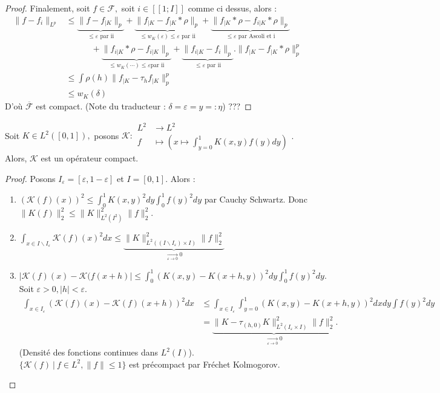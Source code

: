 \begin{proof}
    Finalement, soit $f\in \mathcal{F},$ soit $i\in [\![1;I]\!]$ comme ci dessus, alors :
    \begin{align*}
        \|f-f_i\|_{L^p}&\le \underbrace{\|f-f_{|K}\|_p}_{\le \varepsilon \text{ par ii}} + \underbrace{\|f_{|K}-f_{|K}*\rho\|_{p}}_{\le w_K(\varepsilon )\le \varepsilon \text{ par ii}} + \underbrace{\|f_{|K}*\rho-f_{i|K}*\rho\|_p}_{\le \varepsilon \text{ par Ascoli et i}}\\
        &\hspace{3em}+\underbrace{\|f_{i|K}*\rho-f_{i|K}\|_p}_{\le w_K(\cdots)\le \varepsilon \text{par ii}}+\underbrace{\|f_{i|K}-f_i\|_p}_{\le \varepsilon \text{ par ii}}.
        \|f_{|K}-f_{|K}*\rho\|^p_p \\
        &\le \int \rho(h)\|f_{|K}-\tau_hf_{|K}\|^p_p\\
        &\le w_K(\delta)
    \end{align*}
    D'où $\overline{\mathcal{F}}$ est compact. (Note du traducteur : $\delta=\varepsilon =y=:\eta$) ???
\end{proof}

\begin{ex}
    Soit $K\in L^2([0,1]),$ posons $\mathcal{K} :\begin{aligned}
        L^2 &\longrightarrow L^2 \\
        f &\longmapsto \left(x\mapsto \int_{y=0}^{1} K(x,y)f(y)dy\right)
    \end{aligned}$. Alors, $\mathcal{K}$ est un opérateur compact.
\end{ex}
\begin{proof}
    Posons $I_\varepsilon =[\varepsilon ,1-\varepsilon ]$ et $I=[0,1].$ Alors :
    \begin{enumerate}[label=\roman*]
        \item $\left( \mathcal{K}(f)(x) \right) ^2\le \int_{0}^{1} K(x,y)^2dy \int_{0}^{1} f(y)^2dy  $ par Cauchy Schwartz. Donc $\|K(f)\|^2_2\le \|K\|^2_{L^2(I^2)}\|f\|_2^2.$
        \item $\int_{x\in I \backslash I_\varepsilon }\mathcal{K}(f)(x)^2dx\le \underbrace{\|K\|^2_{L^2((I \backslash I_\varepsilon) \times I)}\|f\|_2^2}_{\underset{\varepsilon \to 0}{\longrightarrow} 0}$
        \item $|\mathcal{K}(f)(x)-\mathcal{K}(f(x+h)|\le \int_{0}^{1} \left( K(x,y)-K(x+h,y) \right) ^2dy \int_{0}^{1} f(y)^ 2dy .$
            Soit $\varepsilon >0, |h| <\varepsilon .$
            \begin{align*}
                \int_{x\in I_\varepsilon }\left( \mathcal{K}(f)(x)-\mathcal{K}(f)(x+h) \right)^2 dx &\le \int_{x\in I_\varepsilon }\int_{y=0}^1\left( K(x,y)-K(x+h,y) \right) ^2dxdy \int f(y)^2dy\\
                        &=\underbrace{\|K-\tau_{(h,0)}K\|^2_{L^2(I_\varepsilon \times I)}\|f\|^2_2}_{\underset{\varepsilon \to 0}{\longrightarrow} 0}.
            \end{align*}
            (Densité des fonctions continues dans $L^2(I)$). \\
            $\{\mathcal{K}(f)\ |\ f\in L^2, \|f\|\le 1\} $ est précompact par Fréchet Kolmogorov.
    \end{enumerate}
\end{proof}

